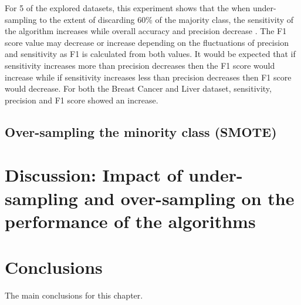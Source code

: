 For 5 of the explored datasets, this experiment shows that the when under-sampling to the extent of discarding 60\% of the majority class, the sensitivity of the algorithm increases while overall accuracy and precision decrease . The F1 score value may decrease or increase depending on the fluctuations of precision and sensitivity as F1 is calculated from both values. It would be expected that if sensitivity increases more than precision decreases then the F1 score would increase while if sensitivity increases less than precision decreases then F1 score would decrease.
For both the Breast Cancer and Liver dataset, sensitivity, precision and F1 score showed an increase.


\subsection{Over-sampling the minority class (SMOTE)}





\section{Discussion: Impact of under-sampling and over-sampling on the performance of the algorithms}




 
\section{Conclusions}

The main conclusions for this chapter.


